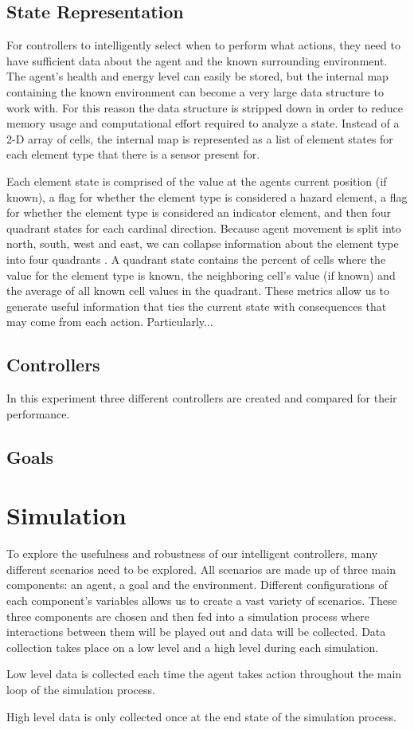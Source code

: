 \subsection{State Representation}
For controllers to intelligently select when to perform what actions, they need to have sufficient data about the agent and the known surrounding environment.
The agent's health and energy level can easily be stored, but the internal map containing the known environment can become a very large data structure to work with.
For this reason the data structure is stripped down in order to reduce memory usage and computational effort required to analyze a state.
Instead of a 2-D array of cells,  the internal map is represented as a list of element states for each element type that there is a sensor present for.

Each element state is comprised of the value at the agents current position (if known), a flag for whether the element type is considered a hazard element, a flag for whether the element type is considered an indicator element, and then four quadrant states for each cardinal direction.
Because agent movement is split into north, south, west and east, we can collapse information about the element type into four quadrants .
A quadrant state contains the percent of cells where the value for the element type is known, the neighboring cell's value (if known) and the average of all known cell values in the quadrant.
These metrics allow us to generate useful information that ties the current state with consequences that may come from each action.
Particularly...



\subsection{Controllers}
In this experiment three different controllers are created and compared for their performance.

\subsection{Goals}


\section{Simulation}
To explore the usefulness and robustness of our intelligent controllers, many different scenarios need to be explored.
All scenarios are made up of three main components: an agent, a goal and the environment.
Different configurations of each component's variables allows us to create a vast variety of scenarios.
These three components are chosen and then fed into a simulation process  where interactions between them will be played out and data will be collected.
Data collection takes place on a low level and a high level during each simulation.

Low level data is collected each time the agent takes action throughout the main loop of the simulation process.

High level data is only collected once at the end state of the simulation process.
